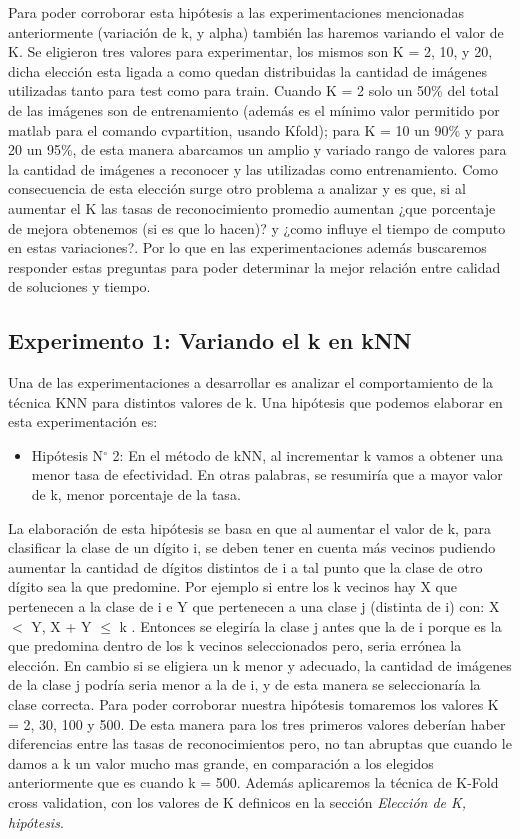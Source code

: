 Para poder corroborar esta hipótesis a las experimentaciones mencionadas anteriormente (variación de k, y alpha) también las haremos variando el valor de K. Se eligieron tres valores para experimentar, los mismos son K =  2, 10, y 20, dicha elección esta ligada a como quedan distribuidas la cantidad de imágenes utilizadas tanto para test como para train. Cuando K = 2 solo un 50\% del total de las imágenes son de entrenamiento (además es el mínimo valor permitido por matlab para el comando cvpartition, usando Kfold); para K = 10 un 90\% y para 20 un 95\%, de esta manera abarcamos un amplio y variado rango de valores para la cantidad de imágenes a reconocer y las utilizadas como entrenamiento. Como consecuencia de esta elección surge otro problema a analizar y es que, si al aumentar el K las tasas de reconocimiento promedio aumentan ¿que porcentaje de mejora obtenemos (si es que lo hacen)? y ¿como influye el tiempo de computo en estas variaciones?. Por lo que en las experimentaciones además buscaremos responder estas preguntas para poder determinar la mejor relación entre calidad de soluciones y tiempo. 


\subsection{Experimento 1: Variando el k en kNN}
Una de las experimentaciones a desarrollar es analizar el comportamiento de la técnica KNN para distintos valores de k. Una hipótesis que podemos elaborar en esta experimentación es: 
\begin{itemize}
\item Hipótesis N$ ^{\circ} $ 2: En el método de kNN, al incrementar k vamos a obtener una menor tasa de efectividad. En otras palabras, se resumiría que a mayor valor de k, menor porcentaje de la tasa.
\end{itemize}
La elaboración de esta hipótesis se basa en que al aumentar el valor de k, para clasificar la clase de un dígito i, se deben tener en cuenta más vecinos pudiendo aumentar la cantidad de dígitos distintos de i a tal punto que la clase de otro dígito sea la que predomine. Por ejemplo si entre los k vecinos hay X que pertenecen a la clase de i e Y que pertenecen a una clase j (distinta de i) con: \newline
 X $<$ Y, X + Y $\leq$ k .\newline
  Entonces se elegiría la clase j antes que la de i porque es la que predomina dentro de los k vecinos seleccionados pero, seria errónea la elección. En cambio si se eligiera un k menor y adecuado, la cantidad de imágenes de la clase j podría seria menor a la de i, y de esta manera se seleccionaría la clase correcta.
Para poder corroborar nuestra hipótesis tomaremos los valores K = 2, 30, 100 y 500. De esta manera para los tres primeros valores deberían haber diferencias entre las tasas de reconocimientos pero, no tan abruptas que cuando le damos a k un valor mucho mas grande, en comparación a los elegidos anteriormente que es cuando k = 500. Además aplicaremos la técnica de K-Fold cross validation, con los valores de K definicos en la sección  \textit{Elección de K, hipótesis}. 

